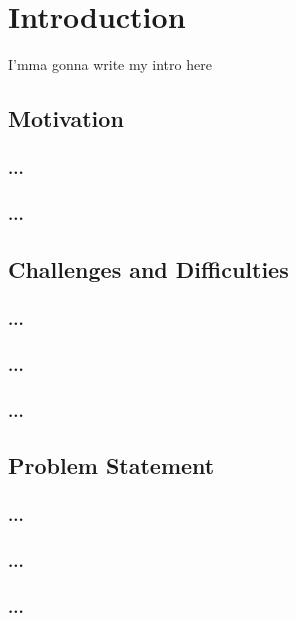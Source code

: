 
\chapter{Introduction}
I'mma gonna write my intro here

\section{Motivation}
\subsection{...}


\subsection{...}


\section{Challenges and Difficulties}
\subsection{...}

\lipsum[11-15]

\subsection{...}

\subsection{...}



\section{Problem Statement}
\subsection{...}

\lipsum[21-30]

\subsection{...}


\subsection{...}
